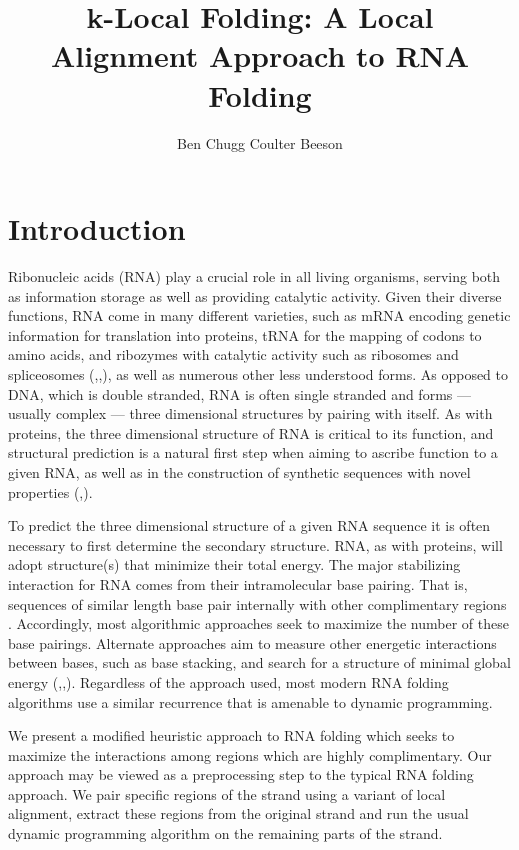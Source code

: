 \documentclass[11pt]{article}
\begin{document}
\title{k-Local Folding: A Local Alignment Approach to RNA Folding}
\author{Ben Chugg \quad Coulter Beeson}
\date{}
\maketitle 



\section{Introduction}

Ribonucleic acids (RNA) play a crucial role in all living organisms, serving both as information storage as well as providing catalytic activity. Given their diverse functions, RNA come in many different varieties, such as mRNA encoding genetic information for translation into proteins, tRNA for the mapping of codons to amino acids, and ribozymes with catalytic activity such as ribosomes and spliceosomes (\cite{eight},\cite{nine},\cite{ten}), as well as numerous other less understood forms. As opposed to DNA, which is double stranded, RNA is often single stranded and forms --- usually complex ---  three dimensional structures by pairing with itself. As with proteins, the three dimensional structure of RNA is critical to its function, and structural prediction is a natural first step when aiming to ascribe function to a given RNA, as well as in the construction of synthetic sequences with novel properties (\cite{one},\cite{two}). 

To predict the three dimensional structure of a given RNA sequence it is often necessary to first determine the secondary structure. RNA, as with proteins, will adopt structure(s) that minimize their total energy. The major stabilizing interaction for RNA comes from their intramolecular base pairing. That is, sequences of similar length base pair internally with other complimentary regions \cite{three}. Accordingly, most algorithmic approaches seek to maximize the number of these base pairings. Alternate approaches aim to measure other energetic interactions between bases, such as base stacking, and search for a structure of minimal global energy (\cite{four},\cite{five},\cite{eight}). Regardless of the approach used, most modern RNA folding algorithms use a similar recurrence that is amenable to dynamic programming. 

We present a modified heuristic approach to RNA folding which seeks to maximize the interactions among regions which are highly complimentary. Our approach may be viewed as a preprocessing step to the typical RNA folding approach. We pair specific regions of the strand using a variant of local alignment, extract these regions from the original strand and run the usual dynamic programming algorithm on the remaining parts of the strand. 
\end{document}
